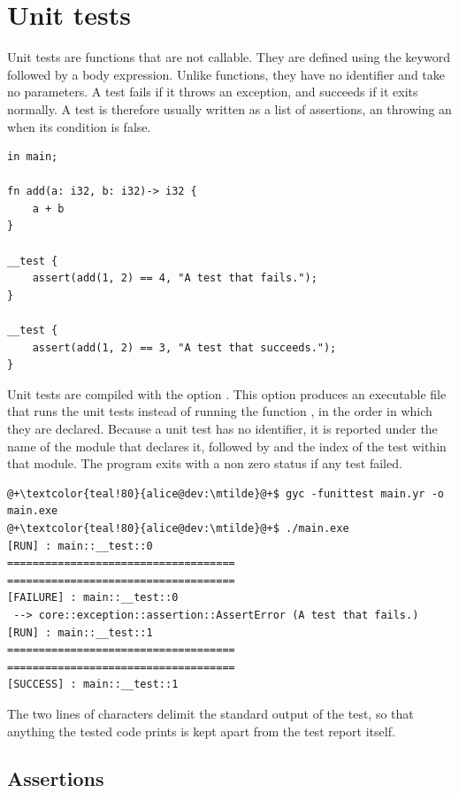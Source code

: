 \section{Unit tests}%
\label{sec:global:unit_test}

Unit tests are functions that are not callable. They are defined using the
keyword  followed by a body expression. Unlike functions, they
have no identifier and take no parameters. A test fails if it throws an
exception, and succeeds if it exits normally. A test is therefore usually
written as a list of assertions, an  throwing an
 when its condition is false.

\begin{lstlisting}[style=coloredverbatim, caption=\textit{main.yr}]
in main;

fn add(a: i32, b: i32)-> i32 {
    a + b
}

__test {
    assert(add(1, 2) == 4, "A test that fails.");
}

__test {
    assert(add(1, 2) == 3, "A test that succeeds.");
}
\end{lstlisting}

Unit tests are compiled with the option . This option produces
an executable file that runs the unit tests instead of running the function
, in the order in which they are declared. Because a unit test has
no identifier, it is reported under the name of the module that declares it,
followed by  and the index of the test within that module. The
program exits with a non zero status if any test failed.

\begin{lstlisting}[style=bashVerb, escapechar=@+]
@+\textcolor{teal!80}{alice@dev:\mtilde}@+$ gyc -funittest main.yr -o main.exe
@+\textcolor{teal!80}{alice@dev:\mtilde}@+$ ./main.exe
[RUN] : main::__test::0
====================================
====================================
[FAILURE] : main::__test::0
 --> core::exception::assertion::AssertError (A test that fails.)
[RUN] : main::__test::1
====================================
====================================
[SUCCESS] : main::__test::1
\end{lstlisting}

The two lines of \token{=} characters delimit the standard output of the test,
so that anything the tested code prints is kept apart from the test report
itself.

\subsection{Assertions}
\label{sec:global:assertions}

